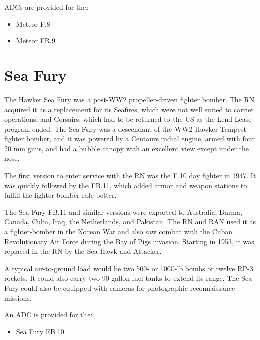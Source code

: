ADCs are provided for the:
\begin{itemize}
\item Meteor F.8
\item Meteor FR.9
\end{itemize}

\section*{Sea Fury}

The Hawker Sea Fury was a post-WW2 propeller-driven fighter bomber. The RN acquired it as a replacement for its Seafires, which were not well suited to carrier operations, and Corsairs, which had to be returned to the US as the Lend-Lease program ended. The Sea Fury was a descendant of the WW2 Hawker Tempest fighter bomber, and it was powered by a Centaurs radial engine, armed with four 20 mm guns, and had a bubble canopy with an excellent view except under the nose.

The first version to enter service with the RN was the F.10 day fighter in 1947. It was quickly followed by the FB.11, which added armor and weapon stations to fulfill the fighter-bomber role better. 

The Sea Fury FB.11 and similar versions were exported to Australia, Burma, Canada, Cuba, Iraq, the Netherlands, and Pakistan. The RN and RAN used it as a fighter-bomber in the Korean War and also saw combat with the Cuban Revolutionary Air Force during the Bay of Pigs invasion. Starting in 1953, it was replaced in the RN by the Sea Hawk and Attacker.

A typical air-to-ground load would be two 500- or 1000-lb bombs or twelve RP-3 rockets. It could also carry two 90-gallon fuel tanks to extend its range. The Sea Fury could also be equipped with cameras for photographic reconnaissance missions.

An ADC is provided for the:
\begin{itemize}
\item Sea Fury FB.10
\end{itemize}
